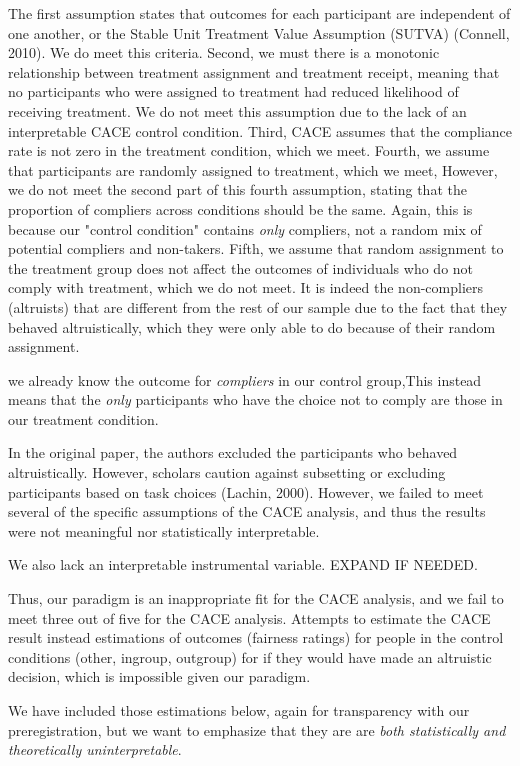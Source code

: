 \documentclass[12pt,]{article}
\begin{document}
The first assumption states that outcomes for each participant are independent of one another, or the Stable Unit Treatment Value Assumption (SUTVA) (Connell, 2010). We do meet this criteria. Second, we must there is a monotonic relationship between treatment assignment and treatment receipt, meaning that no participants who were assigned to treatment had reduced likelihood of receiving treatment. We do not meet this assumption due to the lack of an interpretable CACE control condition. Third, CACE assumes that the compliance rate is not zero in the treatment condition, which we meet. Fourth, we assume that participants are randomly assigned to treatment, which we meet, However, we do not meet the second part of this fourth assumption, stating that the proportion of compliers across conditions should be the same. Again, this is because our "control condition" contains \emph{only} compliers, not a random mix of potential compliers and non-takers. Fifth, we assume that random assignment to the treatment group does not affect the outcomes of individuals who do not comply with treatment, which we do not meet. It is indeed the non-compliers (altruists) that are different from the rest of our sample due to the fact that they behaved altruistically, which they were only able to do because of their random assignment. 



we already know the outcome for \emph{compliers} in our control group,This instead means that the \emph{only} participants who have the choice not to comply are those in our treatment condition.

In the original paper, the authors excluded the participants who behaved altruistically. However, scholars caution against subsetting or excluding participants based on task choices (Lachin, 2000). However, we failed to meet several of the specific assumptions of the CACE analysis, and thus the results were not meaningful nor statistically interpretable. 

We also lack an interpretable instrumental variable. EXPAND IF NEEDED. 

Thus, our paradigm is an inappropriate fit for the CACE analysis, and we fail to meet three out of five for the CACE analysis.  Attempts to estimate the CACE result instead estimations of outcomes (fairness ratings) for people in the control conditions (other, ingroup, outgroup) for if they would have made an altruistic decision, which is impossible given our paradigm. 

We have included those estimations below, again for transparency with our preregistration, but we want to emphasize that they are are \emph{both statistically and theoretically uninterpretable}. 
\end{document}
